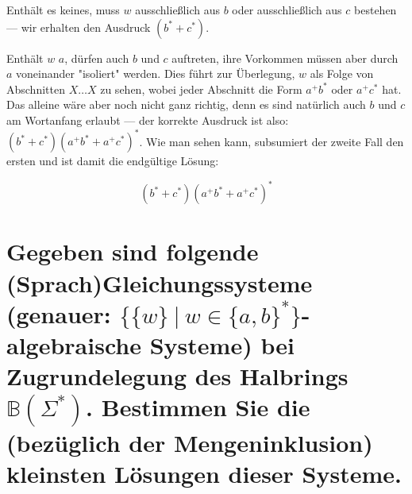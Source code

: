 \documentclass[]{scrartcl}
\begin{document}
Enthält es keines, muss $w$ ausschließlich aus $b$ oder ausschließlich aus $c$ bestehen --- wir erhalten den Ausdruck $(b^* + c^*)$.

Enthält $w$ $a$, dürfen auch $b$ und $c$ auftreten, ihre Vorkommen müssen aber durch $a$ voneinander "isoliert" werden. Dies führt zur Überlegung, $w$ als Folge von Abschnitten $X\dots X$ zu sehen, wobei jeder Abschnitt die Form $a^+b^*$ oder $a^+c^*$ hat. Das alleine wäre aber noch nicht ganz richtig, denn es sind natürlich auch $b$ und $c$ am Wortanfang erlaubt --- der korrekte Ausdruck ist also: $(b^* + c^*)(a^+b^* + a^+c^*)^*$. Wie man sehen kann, subsumiert der zweite Fall den ersten und ist damit die endgültige Lösung:

$$(b^* + c^*)(a^+b^* + a^+c^*)^*$$


\setcounter{section}{11}

\section{Gegeben sind folgende (Sprach)Gleichungssysteme (genauer: $\{ \{w\}\ |\ w \in \{a,b\}^* \}$-algebraische Systeme) bei Zugrundelegung des Halbrings $\mathbb{B}(\Sigma^*)$. Bestimmen Sie die (bezüglich der Mengeninklusion) kleinsten Lösungen dieser Systeme.}
\end{document}
